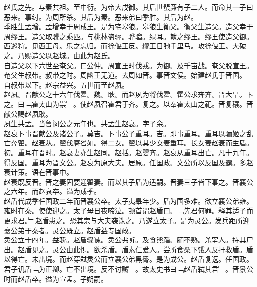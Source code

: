 \documentclass{zhvt-classic}
\begin{document}
\hspace*{2em}赵氏之先。与秦共祖。至中衍。为帝大戊御。其后世蜚廉有子二人。而命其一子曰恶来。事纣。为周所杀。其后为秦。恶来弟曰季胜。其后为赵。\\
\hspace*{2em}季胜生孟增。孟增幸于周成王。是为宅皋狼。皋狼生衡父。衡父生造父。造父幸于周缪王。造父取骥之乘匹。与桃林盗骊。骅骝。绿耳。献之缪王。缪王使造父御。西巡狩。见西王母。乐之忘归。而徐偃王反。缪王日驰千里马。攻徐偃王。大破之。乃赐造父以赵城。由此为赵氏。\\
\hspace*{2em}自造父以下六世至奄父。曰公仲。周宣王时伐戎。为御。及千亩战。奄父脱宣王。奄父生叔带。叔带之时。周幽王无道。去周如晋。事晋文侯。始建赵氏于晋国。\\
\hspace*{2em}自叔带以下。赵宗益兴。五世而至赵夙。\\
\hspace*{2em}赵夙。晋献公之十六年伐霍。魏。耿。而赵夙为将伐霍。霍公求奔齐。晋大旱。卜之。曰﹁霍太山为祟﹂。使赵夙召霍君于齐。复之。以奉霍太山之祀。晋复穰。晋献公赐赵夙耿。\\
\hspace*{2em}夙生共孟。当鲁闵公之元年也。共孟生赵衰。字子余。\\
\hspace*{2em}赵衰卜事晋献公及诸公子。莫吉。卜事公子重耳。吉。即事重耳。重耳以骊姬之乱亡奔翟。赵衰从。翟伐廧咎如。得二女。翟以其少女妻重耳。长女妻赵衰而生盾。\\
\hspace*{2em}初。重耳在晋时。赵衰妻亦生赵同。赵括。赵婴齐。赵衰从重耳出亡。凡十九年。得反国。重耳为晋文公。赵衰为原大夫。居原。任国政。文公所以反国及霸。多赵衰计策。语在晋事中。\\
\hspace*{2em}赵衰既反晋。晋之妻固要迎翟妻。而以其子盾为适嗣。晋妻三子皆下事之。晋襄公之六年。而赵衰卒。谥为成季。\\
\hspace*{2em}赵盾代成季任国政二年而晋襄公卒。太子夷皋年少。盾为国多难。欲立襄公弟雍。雍时在秦。使使迎之。太子母日夜啼泣。顿首谓赵盾曰。﹁先君何罪。释其适子而更求君。﹂赵盾患之。恐其宗与大夫袭诛之。乃遂立太子。是为灵公。发兵距所迎襄公弟于秦者。灵公既立。赵盾益专国政。\\
\hspace*{2em}灵公立十四年。益骄。赵盾骤谏。灵公弗听。及食熊蹯。胹不熟。杀宰人。持其尸出。赵盾见之。灵公由此惧。欲杀盾。盾素仁爱人。尝所食桑下饿人反扞救盾。盾以得亡。未出境。而赵穿弑灵公而立襄公弟黑臀。是为成公。赵盾复返。任国政。君子讥盾﹁为正卿。亡不出境。反不讨贼﹂。故太史书曰﹁赵盾弑其君﹂。晋景公时而赵盾卒。谥为宣孟。子朔嗣。\\
\end{document}
